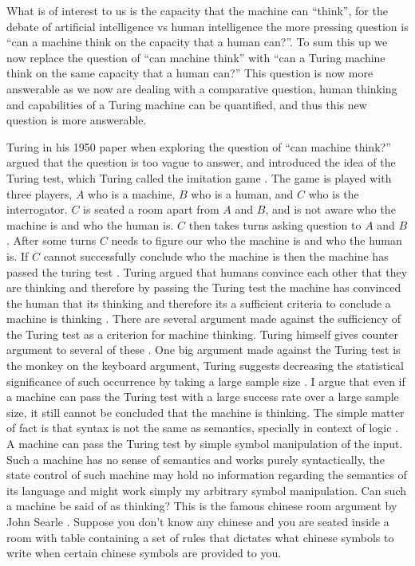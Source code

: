 \documentclass[11pt,a4paper]{article}
\begin{document}
What is of interest to us is the capacity that the machine can ``think'', for the debate of artificial intelligence vs human intelligence the more pressing question is ``can a machine think on the capacity that a human can?''.
To sum this up we now replace the question of ``can machine think'' with ``can a Turing machine think on the same capacity that a human can?''
This question is now more answerable as we now are dealing with a comparative question, human thinking and capabilities of a Turing machine can be quantified, and thus this new question is more answerable.
\\\par
Turing in his 1950 paper when exploring the question of ``can machine think?'' argued that the question is too vague to answer, and introduced the idea of the Turing test, which Turing called the imitation game \cite{Turing50}.
The game is played with three players, $A$ who is a machine, $B$ who is a human, and $C$ who is the interrogator. $C$ is seated a room apart from $A$ and $B$, and is not aware who the machine is and who the human is. 
$C$ then takes turns asking question to $A$ and $B$. After some turns $C$ needs to figure our who the machine is and who the human is. If $C$ cannot successfully conclude who the machine is then the machine has passed the turing test \cite{Turing50}.
Turing argued that humans convince each other that they are thinking and therefore by passing the Turing test the machine has convinced the human that its thinking and therefore its a sufficient criteria to conclude a machine is thinking \cite{Turing50}.
There are several argument made against the sufficiency of the Turing test as a criterion for machine thinking. Turing himself gives counter argument to several of these \cite{Turing50}. 
One big argument made against the Turing test is the monkey on the keyboard argument, Turing suggests decreasing the statistical significance of such occurrence by taking a large sample size \cite{Turing50}.
I argue that even if a machine can pass the Turing test with a large success rate over a large sample size, it still cannot be concluded that the machine is thinking.
The simple matter of fact is that syntax is not the same as semantics, specially in context of logic \cite{Anita}. A machine can pass the Turing test by simple symbol manipulation of the input.
Such a machine has no sense of semantics and works purely syntactically, the state control of such machine may hold no information regarding the semantics of its language and might work simply my arbitrary symbol manipulation.
Can such a machine be said of as thinking? This is the famous chinese room argument by John Searle \cite{Searle}. Suppose you don't know any chinese and you are seated inside a room with table containing a set of rules that dictates what chinese symbols to write when certain chinese symbols are provided to you.
\end{document}
